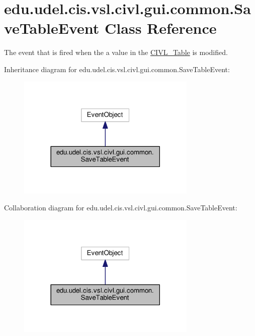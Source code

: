 \hypertarget{classedu_1_1udel_1_1cis_1_1vsl_1_1civl_1_1gui_1_1common_1_1SaveTableEvent}{}\section{edu.\+udel.\+cis.\+vsl.\+civl.\+gui.\+common.\+Save\+Table\+Event Class Reference}
\label{classedu_1_1udel_1_1cis_1_1vsl_1_1civl_1_1gui_1_1common_1_1SaveTableEvent}


The event that is fired when the a value in the \hyperlink{}{C\+I\+V\+L\+\_\+\+Table} is modified.  




Inheritance diagram for edu.\+udel.\+cis.\+vsl.\+civl.\+gui.\+common.\+Save\+Table\+Event\+:
\nopagebreak
\begin{figure}[H]
\begin{center}
\leavevmode
\includegraphics[width=242pt]{classedu_1_1udel_1_1cis_1_1vsl_1_1civl_1_1gui_1_1common_1_1SaveTableEvent__inherit__graph}
\end{center}
\end{figure}


Collaboration diagram for edu.\+udel.\+cis.\+vsl.\+civl.\+gui.\+common.\+Save\+Table\+Event\+:
\nopagebreak
\begin{figure}[H]
\begin{center}
\leavevmode
\includegraphics[width=242pt]{classedu_1_1udel_1_1cis_1_1vsl_1_1civl_1_1gui_1_1common_1_1SaveTableEvent__coll__graph}
\end{center}
\end{figure}
